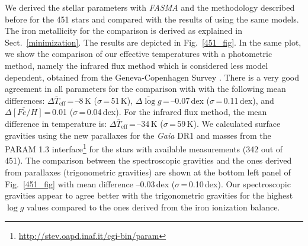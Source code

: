 \documentclass[fleqn,usenatbib]{mnras}
\begin{document}
We derived the stellar parameters with \textit{FASMA} and the methodology described before for the 451 stars and compared with the results of \cite{tsantaki13} using the same models. 
The iron metallicity for the comparison is derived as explained in Sect.~\ref{minimization}.
The results are depicted in Fig.~\ref{451_fig}. In the same plot, we show the comparison of our effective temperatures with a photometric method, namely the infrared flux method which is 
considered less model dependent, obtained from the Geneva-Copenhagen Survey \citep{Casagrande2011}. There is a very good agreement in all parameters for the comparison with \cite{tsantaki13} 
with the following mean differences: $\overline{\Delta T_{\mathrm{eff}}}$\,=\,--8\,K ($\sigma$\,=\,51\,K), $\overline{\Delta \log g}$\,=\,--0.07\,dex ($\sigma$\,=\,0.11\,dex), and 
$\overline{\Delta [Fe/H]}$\,=\,0.01 ($\sigma$\,=\,0.04\,dex). For the infrared flux method, the mean difference in temperature is: 
$\overline{\Delta T_{\mathrm{eff}}}$\,=\,--34\,K ($\sigma$\,=\,59\,K). We calculated surface gravities using the new parallaxes for the \textit{Gaia} DR1 \citep{Gaia2016} and masses 
from the PARAM 1.3 interface\footnote{\url{http://stev.oapd.inaf.it/cgi-bin/param}} \citep{dasilva06} for the stars with available measurements (342 out of 451). 
The comparison between the spectroscopic gravities and the ones derived from parallaxes (trigonometric gravities) are shown at the bottom left panel of Fig.~\ref{451_fig} with mean 
difference --0.03\,dex ($\sigma$\,=\,0.10\,dex). Our spectroscopic gravities appear to agree better with the trigonometric gravities for the highest $\log g$ values 
compared to the ones derived from the iron ionization balance. 
\end{document}
